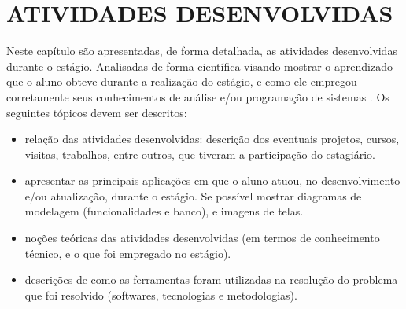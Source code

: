 
\chapter{ATIVIDADES DESENVOLVIDAS}
\label{chap:atividade-desenvolvida}

Neste capítulo são apresentadas, de forma detalhada, as atividades desenvolvidas durante o estágio. Analisadas de forma científica visando mostrar o aprendizado que o aluno obteve durante a realização do estágio, e como ele empregou corretamente seus conhecimentos de análise e/ou programação de sistemas \cite{ApacheProject2018}. Os seguintes tópicos devem ser descritos:
\begin{itemize}
\item relação das atividades desenvolvidas: descrição dos eventuais projetos, cursos, visitas, trabalhos, entre outros, que tiveram a participação do estagiário.
\item apresentar as principais aplicações em que o aluno atuou, no desenvolvimento e/ou atualização, durante o estágio. Se possível mostrar diagramas de modelagem (funcionalidades e banco), e imagens de telas.
\item noções teóricas das atividades desenvolvidas (em termos de conhecimento técnico, e o que foi empregado no estágio).
\item descrições de como as ferramentas foram utilizadas na resolução do problema que foi resolvido (softwares, tecnologias e metodologias).
\end{itemize}



